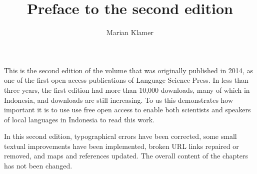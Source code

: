 \documentclass[output=paper]{LSP/langsci}
\title{Preface to the second edition}
\author{Marian Klamer}
\makeatletter
\renewcommand{\lsCollectionPaperTitle}{{%
  \renewcommand{\newlineTOC}{}
  \renewcommand{\newlineCover}{\\} 
  \\[-1\baselineskip]
  \noindent{\LARGE ~}\\
  \bigskip  
  \noindent\@title}}
\renewcommand{\lsCollectionPaperTOC}{{%
  \iflsCollectionChapter%
    \protect\numberline{~}\fi
  \@title\newline{\normalfont\@author}}}
\makeatother
\begin{document}

\noindent
This is the second edition of the volume that was originally published in 2014, as one of the first open access publications of Language Science Press. In less than three years, the first edition had more than 10,000 downloads, many of which in Indonesia, and downloads are still increasing. To us this demonstrates how important it is to use use free open access to enable both scientists and speakers of local languages in Indonesia to read this work. 

In this second edition, typographical errors have been corrected, some small textual improvements have been implemented, broken URL links repaired or removed, and maps and references updated. The overall content of the chapters has not been changed.


\renewcommand{\lsCollectionPaperTitle}{{%
  \renewcommand{\newlineTOC}{}
  \renewcommand{\newlineCover}{\\} 
  \\[-1\baselineskip]
  \noindent{\LARGE Chapter \thechapter}\\
  \bigskip  
  \@title}}
  
  \renewcommand{\lsCollectionPaperTOC}{{%
  \iflsCollectionChapter%
    \protect\numberline{\thechapter}\fi
  \@title\newline{\normalfont\@author}}}

  
\end{document}
